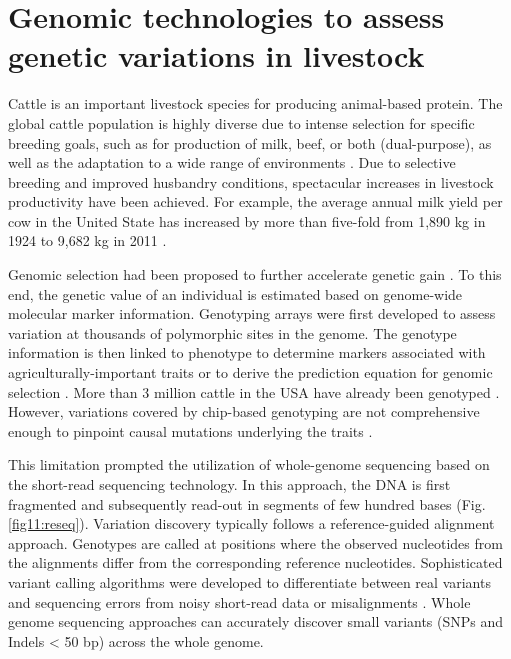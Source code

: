 \documentclass[../main.tex]{subfiles}
\begin{document}
\fi


\graphicspath{{figure/}{../figure/}}

\newpage
\onehalfspacing

\linespread{1.25}
\setlength{\parskip}{\baselineskip}

\normalsize

\section{Genomic technologies to assess genetic variations in livestock}

Cattle is an important livestock species for producing animal-based protein. The global cattle population is highly diverse due to intense selection for specific breeding goals, such as for production of milk, beef, or both (dual-purpose), as well as the adaptation to a wide range of environments \citep{zhang2020evolution}. Due to selective breeding and improved husbandry conditions, spectacular increases in livestock productivity have been achieved. For example, the average annual milk yield per cow in the United State has increased by more than five-fold from 1,890 kg in 1924 to 9,682 kg in 2011 \citep{georges2019harnessing}. 

Genomic selection had been proposed to further accelerate genetic gain \citep{meuwissen2001prediction}. To this end, the genetic value of an individual is estimated based on genome-wide molecular marker information. Genotyping arrays were first developed to assess variation at thousands of polymorphic sites in the genome. The genotype information is then linked to phenotype to determine markers associated with agriculturally-important traits \citep{goddard2009mapping} or to derive the prediction equation for genomic selection \citep{meuwissen2001prediction}. More than 3 million cattle in the USA have already been genotyped \citep{wiggans2017genomic}. However, variations covered by chip-based genotyping  are  not comprehensive enough  to pinpoint causal mutations underlying the traits \citep{pausch2017evaluation}.

This limitation prompted the utilization of whole-genome sequencing based on the short-read sequencing technology. In this approach, the DNA is first fragmented and subsequently read-out in segments of few hundred bases (Fig. \ref{fig11:reseq}). Variation discovery typically follows a reference-guided alignment approach. Genotypes are called at positions where the observed nucleotides from the alignments differ from the corresponding reference nucleotides. Sophisticated variant calling algorithms were developed to differentiate between real variants and sequencing errors from noisy short-read data or misalignments \citep{depristo2011framework}. Whole genome sequencing approaches can accurately discover small variants (SNPs and Indels < 50 bp) across the whole genome. 
\end{document}
